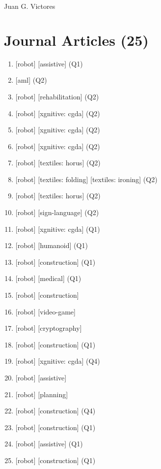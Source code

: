 \documentclass{article}
\def\name{Juan G. Victores}
\begin{document}
{\huge \name}

\vspace{0.2in}



\section*{Journal Articles (25)}
\begin{enumerate}
  \item {} [robot] [assistive] (Q1)
  \item {} [aml] (Q2)
  \item {} [robot] [rehabilitation] (Q2)
  \item {} [robot] [xgnitive: cgda] (Q2)
  \item {} [robot] [xgnitive: cgda] (Q2)
  \item {} [robot] [xgnitive: cgda] (Q2)
  \item {} [robot] [textiles: horus] (Q2)
  \item {} [robot] [textiles: folding] [textiles: ironing] (Q2)
  \item {} [robot] [textiles: horus] (Q2)
  \item {} [robot] [sign-language] (Q2)
  \item {} [robot] [xgnitive: cgda] (Q1)
  \item {} [robot] [humanoid] (Q1)
  \item {} [robot] [construction] (Q1)
  \item {} [robot] [medical] (Q1)
  \item {} [robot] [construction]
  \item {} [robot] [video-game]
  \item {} [robot] [cryptography]
  \item {} [robot] [construction] (Q1)
  \item {} [robot] [xgnitive: cgda] (Q4)
  \item {} [robot] [assistive]
  \item {} [robot] [planning]
  \item {} [robot] [construction] (Q4)
  \item {} [robot] [construction] (Q1)
  \item {} [robot] [assistive] (Q1)
  \item {} [robot] [construction] (Q1)
\end{enumerate}
\end{document}
